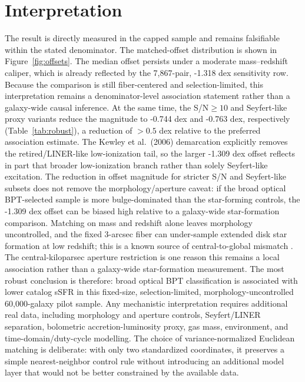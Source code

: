 \documentclass[twocolumn]{aastex631}
\begin{document}
\section{Interpretation}
The result is directly measured in the capped sample and remains falsifiable within the stated denominator. The matched-offset distribution is shown in Figure~\ref{fig:offsets}. The median offset persists under a moderate mass--redshift caliper, which is already reflected by the 7,867-pair, -1.318 dex sensitivity row. Because the comparison is still fiber-centered and selection-limited, this interpretation remains a denominator-level association statement rather than a galaxy-wide causal inference. At the same time, the S/N$\geq10$ and Seyfert-like proxy variants reduce the magnitude to -0.744 dex and -0.763 dex, respectively (Table~\ref{tab:robust}), a reduction of $>0.5$ dex relative to the preferred association estimate. The Kewley et al.\ (2006) demarcation explicitly removes the retired/LINER-like low-ionization tail, so the larger -1.309 dex offset reflects in part that broader low-ionization branch rather than solely Seyfert-like excitation. The reduction in offset magnitude for stricter S/N and Seyfert-like subsets does not remove the morphology/aperture caveat: if the broad optical BPT-selected sample is more bulge-dominated than the star-forming controls, the -1.309 dex offset can be biased high relative to a galaxy-wide star-formation comparison. Matching on mass and redshift alone leaves morphology uncontrolled, and the fixed 3-arcsec fiber can under-sample extended disk star formation at low redshift; this is a known source of central-to-global mismatch \citep[e.g.,][]{harrison2017,ellison2021}. The central-kiloparsec aperture restriction is one reason this remains a local association rather than a galaxy-wide star-formation measurement. The most robust conclusion is therefore: broad optical BPT classification is associated with lower catalog sSFR in this fixed-size, selection-limited, morphology-uncontrolled 60,000-galaxy pilot sample. Any mechanistic interpretation requires additional real data, including morphology and aperture controls, Seyfert/LINER separation, bolometric accretion-luminosity proxy, gas mass, environment, and time-domain/duty-cycle modelling.
The choice of variance-normalized Euclidean matching is deliberate: with only two standardized coordinates, it preserves a simple nearest-neighbor control rule without introducing an additional model layer that would not be better constrained by the available data.
\end{document}
